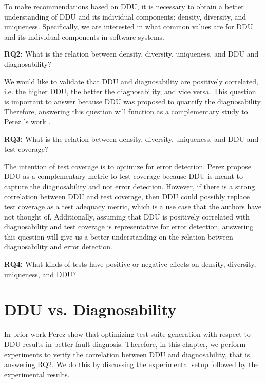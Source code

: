 \documentclass[twoside,a4paper,11pt]{memoir}
\begin{document}
To make recommendations based on DDU, it is necessary to obtain a better understanding of DDU and its individual components: density, diversity, and uniqueness.
Specifically, we are interested in what common values are for DDU and its individual components in software systems.

\begin{framed}
\noindent
\textbf{RQ2:} What is the relation between density, diversity, uniqueness, and DDU and diagnosability?
\end{framed}

We would like to validate that DDU and diagnosability are positively correlated, i.e. the higher DDU, the better the diagnosability, and vice versa.
This question is important to answer because DDU was proposed to quantify the diagnosability.
Therefore, answering this question will function as a complementary study to Perez \etal's work \cite{DBLP:conf/icse/PerezAD17}.

\begin{framed}
\noindent
\textbf{RQ3:} What is the relation between density, diversity, uniqueness, and DDU and test coverage?
\end{framed}

The intention of test coverage is to optimize for error detection.
Perez \etal propose DDU as a complementary metric to test coverage \cite{DBLP:conf/icse/PerezAD17} because DDU is meant to capture the diagnosability and not error detection.
However, if there is a strong correlation between DDU and test coverage, then DDU could possibly replace test coverage as a test adequacy metric, which is a use case that the authors have not thought of.
Additionally, assuming that DDU is positively correlated with diagnosability and test coverage is representative for error detection, answering this question will give us a better understanding on the relation between diagnosability and error detection.

\begin{framed}
\noindent
\textbf{RQ4:} What kinds of tests have positive or negative effects on density, diversity, uniqueness, and DDU?
\end{framed}
\chapter{DDU vs. Diagnosability}
\label{ch:rq2}
In prior work Perez \etal \cite{DBLP:conf/icse/PerezAD17} show that optimizing test suite generation with respect to DDU results in better fault diagnosis.
Therefore, in this chapter, we perform experiments to verify the correlation between DDU and diagnosability, that is, answering RQ2.
We do this by discussing the experimental setup followed by the experimental results.
\end{document}
